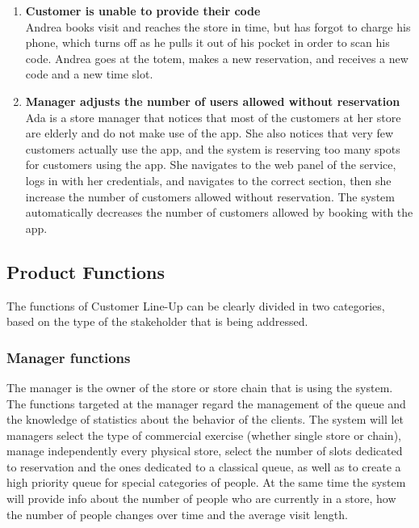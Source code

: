 \begin{enumerate}[label=\Alph*.]
        \item \textbf{Customer is unable to provide their code}\\
            Andrea books visit and reaches the store in time, but has forgot to charge his phone, which turns off as he pulls it out of his pocket in order to scan his code.
            Andrea goes at the totem, makes a new reservation, and receives a new code and a new time slot.
        \item \textbf{Manager adjusts the number of users allowed without reservation}\\
            Ada is a store manager that notices that most of the customers at her store are elderly and do not make use of the app. She also notices that very few
            customers actually use the app, and the system is reserving too many spots for customers using the app. She navigates to the web panel of the service,
            logs in with her credentials, and navigates to the correct section, then she increase the number of customers allowed without reservation. The system
            automatically decreases the number of customers allowed by booking with the app.
        \end{enumerate}
\subsection{Product Functions}
The functions of Customer Line-Up can be clearly divided in two categories, based on the type of the stakeholder that is being addressed.

\subsubsection{Manager functions}
The manager is the owner of the store or store chain that is using the system.
The functions targeted at the manager regard the management of the queue and the knowledge of statistics about the behavior of the clients.
The system will let managers select the type of commercial exercise (whether single store or chain), manage independently every physical store,
select the number of slots dedicated to reservation and the ones dedicated to a classical queue,
as well as to create a high priority queue for special categories of people.
At the same time the system will provide info about the number of people who are currently in a store,
how the number of people changes over time and the average visit length.

